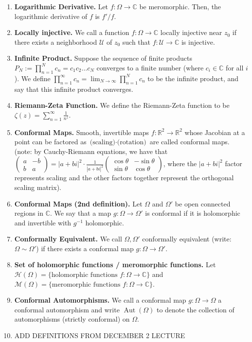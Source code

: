 \documentclass[11pt]{article}
\theoremstyle{definition}
\theoremstyle{named}
\DeclareMathOperator{\Aut}{Aut}
\begin{document}
\begin{enumerate}
    \item \textbf{Logarithmic Derivative. } Let $f: \Omega \to \mathbb{C}$ be meromorphic. Then, the logarithmic derivative of $f$ is $f'/f$. 
    \item \textbf{Locally injective. } We call a function $f: \Omega \to \mathbb{C}$ locally injective near $z_0$ if there exists a neighborhood $\mathcal{U}$ of $z_0$ such that $f: \mathcal{U} \to \mathbb{C}$ is injective. 
    \item \textbf{Infinite Product. } Suppose the sequence of finite products $P_N := \prod_{n=1}^{N} c_n = c_1 c_2 \dots c_N$ converges to a finite number (where $c_i \in \mathbb{C}$ for all $i$). We define $\prod_{n=1}^{\infty} c_n = \lim_{N \to \infty} \prod_{n=1}^{N} c_n$ to be the infinite product, and say that this infinite product converges. 
    \item \textbf{Riemann-Zeta Function. } We define the Riemann-Zeta function to be $\zeta(z) = \sum_{n=1}^{\infty} \frac{1}{n^z}$. 
    \item \textbf{Conformal Maps. } Smooth, invertible maps $f: \mathbb{R}^2 \to \mathbb{R}^2$ whose Jacobian at a point can be factored as $\textrm{(scaling)} \cdot \textrm{(rotation)}$ are called conformal maps. (note: by Cauchy-Riemann equations, we have that $\begin{pmatrix}
        a & -b \\
        b & a
    \end{pmatrix} = |a+bi|^2 \cdot \frac{1}{|a+bi|^2} \begin{pmatrix}
        \cos\theta & -\sin\theta \\
        \sin\theta & \cos\theta
    \end{pmatrix}$, where the $|a+bi|^2$ factor represents scaling and the other factors together represent the orthogonal scaling matrix). 
    \item \textbf{Conformal Maps (2nd definition). } Let $\Omega$ and $\Omega'$ be open connected regions in $\mathbb{C}$. We say that a map $g: \Omega \to \Omega'$ is conformal if it is holomorphic and invertible with $g^{-1}$ holomorphic. 
    \item \textbf{Conformally Equivalent. } We call $\Omega,\Omega'$ conformally equivalent (write: $\Omega \sim \Omega'$) if there exists a conformal map $g: \Omega \to \Omega'$. 
    \item \textbf{Set of holomorphic functions / meromorphic functions. } Let $\mathcal{H}(\Omega) = \{\textrm{holomorphic functions $f: \Omega \to \mathbb{C}$}\}$ and $\mathcal{M}(\Omega) = \{\textrm{meromorphic functions $f: \Omega \to \mathbb{C}$}\}$.
    \item \textbf{Conformal Automorphisms. } We call a conformal map $g: \Omega \to \Omega$ a conformal automorphism and write $\Aut(\Omega)$ to denote the collection of automorphisms (strictly conformal) on $\Omega$. 
    \item ADD DEFINITIONS FROM DECEMBER 2 LECTURE
\end{enumerate}
\end{document}
